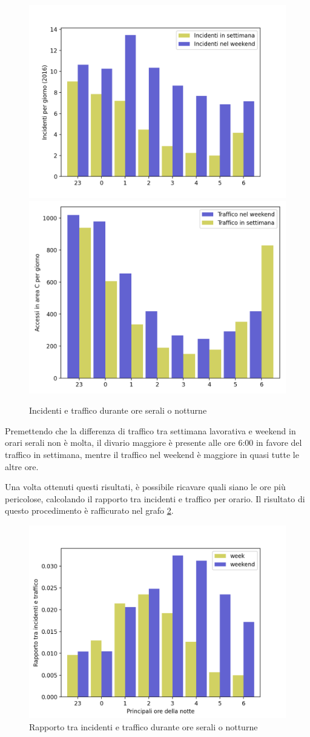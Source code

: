 \documentclass[a4paper,12pt]{report}
\begin{document}
\begin{figure}
    \includegraphics[width=0.5\linewidth]{../src/incidenti/incidenti_senza_coords/ore_punta/ore_notte.png}
    \includegraphics[width=0.48\linewidth]{../src/area_c/traffico_serale.png}
    \caption{Incidenti e traffico durante ore serali o notturne}
    \label{fig:ore-notte}
\end{figure}

Premettendo che la differenza di traffico tra settimana lavorativa e 
weekend in orari serali non è molta, il divario maggiore è presente alle ore 6:00 
in favore del traffico in settimana, mentre il traffico nel weekend è maggiore in 
quasi tutte le altre ore.

Una volta ottenuti questi risultati, è possibile ricavare quali siano le ore 
più pericolose, calcolando il rapporto tra incidenti e traffico per orario.
Il risultato di questo procedimento è rafficurato nel grafo \ref{fig:rapp-inc-traff}.

\begin{figure}
    \includegraphics[width=\linewidth]{../src/area_c/rapporto_inc_notte.png}
    \caption{Rapporto tra incidenti e traffico durante ore serali o notturne}
    \label{fig:rapp-inc-traff}
\end{figure}
\end{document}
